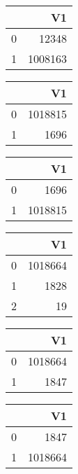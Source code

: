 \bigskip\bigskip
\centering
\begin{tabular}{rr}
  \hline
 & V1 \\ 
  \hline
0 & 12348 \\ 
  1 & 1008163 \\ 
   \hline
\end{tabular}

\bigskip\bigskip
\centering
\begin{tabular}{rr}
  \hline
 & V1 \\ 
  \hline
0 & 1018815 \\ 
  1 & 1696 \\ 
   \hline
\end{tabular}

\bigskip\bigskip
\centering
\begin{tabular}{rr}
  \hline
 & V1 \\ 
  \hline
0 & 1696 \\ 
  1 & 1018815 \\ 
   \hline
\end{tabular}

\bigskip\bigskip
\centering
\begin{tabular}{rr}
  \hline
 & V1 \\ 
  \hline
0 & 1018664 \\ 
  1 & 1828 \\ 
  2 &  19 \\ 
   \hline
\end{tabular}

\bigskip\bigskip
\centering
\begin{tabular}{rr}
  \hline
 & V1 \\ 
  \hline
0 & 1018664 \\ 
  1 & 1847 \\ 
   \hline
\end{tabular}

\bigskip\bigskip
\centering
\begin{tabular}{rr}
  \hline
 & V1 \\ 
  \hline
0 & 1847 \\ 
  1 & 1018664 \\ 
   \hline
\end{tabular}


